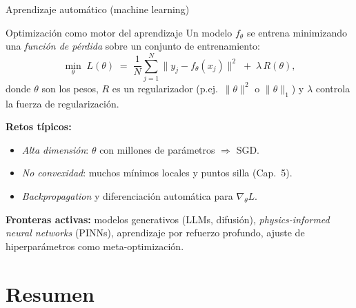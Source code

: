 \documentclass[10pt,aspectratio=169]{beamer}
\theoremstyle{definition}
\theoremstyle{plain}
\begin{document}
\begin{frame}[t]{Aprendizaje automático (machine learning)}
  \begin{block}{Optimización como motor del aprendizaje}
    Un modelo $f_{\theta}$ se entrena minimizando una \emph{función de pérdida}
    sobre un conjunto de entrenamiento:
    \[
      \min_{\theta}\; L(\theta) \;=\; \frac{1}{N}\sum_{j=1}^{N}
      \|y_{j} - f_{\theta}(x_{j})\|^{2} \;+\; \lambda\,R(\theta),
    \]
    donde $\theta$ son los pesos, $R$ es un regularizador (p.ej.\ $\|\theta\|^{2}$
    o $\|\theta\|_{1}$) y $\lambda$ controla la fuerza de regularización.
  \end{block}

  \vspace{0.2em}
  \textbf{Retos típicos:}
  \begin{itemize}\setlength\itemsep{-2pt}
    \item \emph{Alta dimensión}: $\theta$ con millones de parámetros $\Rightarrow$ SGD.
    \item \emph{No convexidad}: muchos mínimos locales y puntos silla (Cap.~5).
    \item \emph{Backpropagation} y diferenciación automática para $\nabla_{\theta}L$.
  \end{itemize}

  \vspace{0.2em}
  \textbf{Fronteras activas:} modelos generativos (LLMs, difusión),
  \emph{physics-informed neural networks} (PINNs), aprendizaje por
  refuerzo profundo, ajuste de hiperparámetros como meta-optimización.

\end{frame}

\section*{Resumen}
\end{document}
